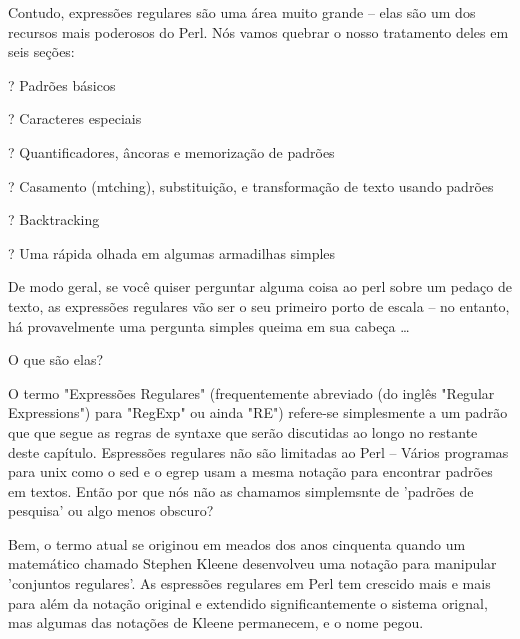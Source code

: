 \documentclass[a4paper,11pt]{book}
\begin{document}
\noindent 

\noindent Contudo, expressões regulares são uma área muito grande -- elas são um dos recursos mais poderosos do Perl.
Nós vamos quebrar o nosso tratamento deles em seis seções: 

\noindent 

\noindent ? Padrões básicos

\noindent 

\noindent ? Caracteres especiais

\noindent 

\noindent ? Quantificadores, âncoras e memorização de padrões

\noindent 

\noindent ? Casamento (mtching), substituição, e transformação de texto usando padrões

\noindent 

\noindent ? Backtracking

\noindent 

\noindent ? Uma rápida olhada em algumas armadilhas simples

\noindent 

\noindent De modo geral, se você quiser perguntar alguma coisa ao perl sobre um pedaço de texto, as expressões regulares
vão ser o seu primeiro porto de escala -- no entanto, há provavelmente uma pergunta simples queima em sua cabeça
\dots 

\noindent  

\noindent  

\noindent  

\noindent  

\noindent 

\noindent 

\noindent O que são elas?

\noindent

\noindent O termo "Expressões Regulares" (frequentemente abreviado (do inglês "Regular Expressions") para "RegExp" ou ainda "RE") refere-se simplesmente a um padrão que que segue as regras de syntaxe que serão discutidas ao longo no restante deste capítulo. Espressões regulares não são  limitadas ao Perl -- Vários programas para unix como o sed e o egrep usam a mesma notação para encontrar padrões em textos. Então por que nós não as chamamos simplemsnte de 'padrões de pesquisa' ou algo menos obscuro?

\noindent

\noindent Bem, o termo atual se originou em meados dos anos cinquenta quando um matemático chamado Stephen Kleene desenvolveu uma notação para manipular 'conjuntos regulares'. As espressões regulares em Perl tem crescido mais e mais para além da notação original e extendido significantemente o sistema orignal, mas algumas das notações de Kleene permanecem, e o nome pegou.
\end{document}
